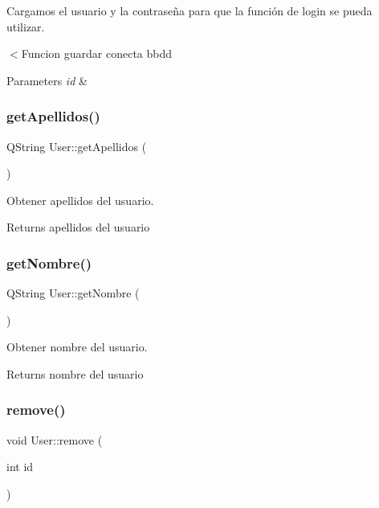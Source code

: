 Cargamos el usuario y la contraseña para que la función de login se pueda utilizar. 

$<$Funcion guardar conecta bbdd


\begin{DoxyParams}{Parameters}
{\em id} & \\
\hline
\end{DoxyParams}
\mbox{\label{classUser_abe1cf0f201fe92b0d0f4540689477bd4}} 
\subsubsection{\texorpdfstring{get\+Apellidos()}{getApellidos()}}
{\footnotesize\ttfamily Q\+String User\+::get\+Apellidos (\begin{DoxyParamCaption}{ }\end{DoxyParamCaption})}



Obtener apellidos del usuario. 

\begin{DoxyReturn}{Returns}
apellidos del usuario 
\end{DoxyReturn}
\mbox{\label{classUser_a3cc589543a052946a1255135f855b61f}} 
\subsubsection{\texorpdfstring{get\+Nombre()}{getNombre()}}
{\footnotesize\ttfamily Q\+String User\+::get\+Nombre (\begin{DoxyParamCaption}{ }\end{DoxyParamCaption})}



Obtener nombre del usuario. 

\begin{DoxyReturn}{Returns}
nombre del usuario 
\end{DoxyReturn}
\mbox{\label{classUser_a7c4b278350236406ce9dcd6b8f707f47}} 
\subsubsection{\texorpdfstring{remove()}{remove()}}
{\footnotesize\ttfamily void User\+::remove (\begin{DoxyParamCaption}\item[{int}]{id }\end{DoxyParamCaption})\hspace{0.3cm}{\ttfamily [static]}}



